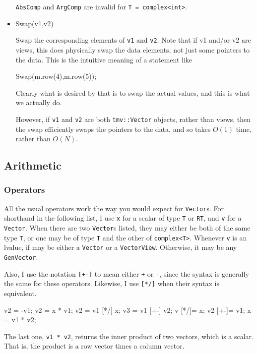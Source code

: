 \documentclass[twoside,letterpaper,11pt]{article}
\renewcommand{\tt}[1]{{\lstinline {#1}}}
\begin{document}
\begin{itemize}
\tt{AbsComp} and \tt{ArgComp} are invalid for \tt{T = complex<int>}.

\item
\begin{tmvcode}
Swap(v1,v2)
\end{tmvcode}
Swap the corresponding elements of \tt{v1} and \tt{v2}.  Note that if v1 and/or v2 are
views, this does physically
swap the data elements, not just some pointers to the data.  This is the intuitive 
meaning of a statement like
\begin{tmvcode}
Swap(m.row(4),m.row(5));
\end{tmvcode}
Clearly what is desired by that is to swap the actual values, and this is what we actually do.

However, if \tt{v1} and \tt{v2} are both \tt{tmv::Vector} objects, rather than views, then the 
swap efficiently swaps the pointers to the data, and so takes $O(1)$ time, rather than
$O(N)$.

\end{itemize}

\subsection{Arithmetic}
\label{Vector_Arithmetic}

\subsubsection{Operators}

All the usual operators work the way you would expect for \tt{Vector}s.  For shorthand in the 
following list, I use \tt{x} for a scalar of type \tt{T} or \tt{RT}, and
\tt{v} for a \tt{Vector}.  When there are two \tt{Vector}s
listed, they may either be both of the same type \tt{T}, or one may be of type 
\tt{T} and the other of \tt{complex<T>}.  Whenever \tt{v} is an lvalue,
if may be either a \tt{Vector} or a \tt{VectorView}.  Otherwise, it may be any \tt{GenVector}.

Also, I use the notation \tt{[+-]} to mean either \tt{+} or \tt{-}, since
the syntax is generally the same for these operators.
Likewise, I use \tt{[*/]} when their syntax is equivalent.

\begin{tmvcode}
v2 = -v1;
v2 = x * v1;
v2 = v1 [*/] x;
v3 = v1 [+-] v2;
v [*/]= x;
v2 [+-]= v1;
x = v1 * v2;
\end{tmvcode}
The last one, \tt{v1 * v2},
returns the inner product of two vectors, which is a scalar.  That is, the product
is a row vector times a column vector.  
\end{document}
